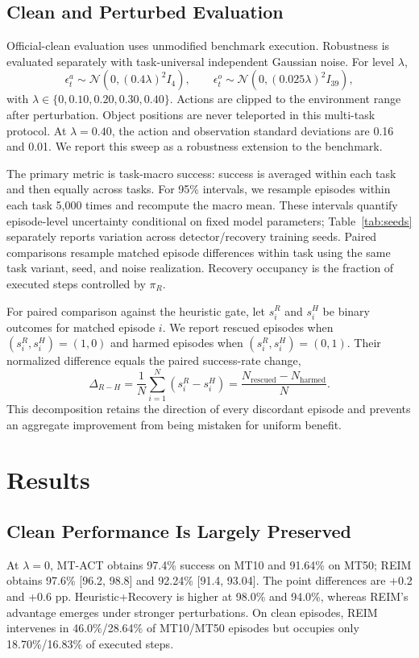 \documentclass[conference]{IEEEtran}
\newcommand{\noise}{\lambda}
\begin{document}
\subsection{Clean and Perturbed Evaluation}
Official-clean evaluation uses unmodified benchmark execution. Robustness is evaluated separately with task-universal independent Gaussian noise. For level $\noise$,
\begin{equation}
 \epsilon^a_t\sim\mathcal{N}(0,(0.4\noise)^2I_4),\qquad
 \epsilon^o_t\sim\mathcal{N}(0,(0.025\noise)^2I_{39}),
\end{equation}
with $\noise\in\{0,0.10,0.20,0.30,0.40\}$. Actions are clipped to the environment range after perturbation. Object positions are never teleported in this multi-task protocol. At $\noise=0.40$, the action and observation standard deviations are 0.16 and 0.01. We report this sweep as a robustness extension to the benchmark.

The primary metric is task-macro success: success is averaged within each task and then equally across tasks. For 95\% intervals, we resample episodes within each task 5,000 times and recompute the macro mean. These intervals quantify episode-level uncertainty conditional on fixed model parameters; Table~\ref{tab:seeds} separately reports variation across detector/recovery training seeds. Paired comparisons resample matched episode differences within task using the same task variant, seed, and noise realization. Recovery occupancy is the fraction of executed steps controlled by $\pi_R$.

For paired comparison against the heuristic gate, let $s_i^R$ and $s_i^H$ be binary outcomes for matched episode $i$. We report rescued episodes when $(s_i^R,s_i^H)=(1,0)$ and harmed episodes when $(s_i^R,s_i^H)=(0,1)$. Their normalized difference equals the paired success-rate change,
\begin{equation}
 \Delta_{R-H}=\frac{1}{N}\sum_{i=1}^{N}(s_i^R-s_i^H)
 =\frac{N_{\mathrm{rescued}}-N_{\mathrm{harmed}}}{N}.
\end{equation}
This decomposition retains the direction of every discordant episode and prevents an aggregate improvement from being mistaken for uniform benefit.

\section{Results}
\label{sec:results}

\subsection{Clean Performance Is Largely Preserved}
At $\noise=0$, MT-ACT obtains 97.4\% success on MT10 and 91.64\% on MT50; REIM obtains 97.6\% [96.2, 98.8] and 92.24\% [91.4, 93.04]. The point differences are +0.2 and +0.6 pp. Heuristic+Recovery is higher at 98.0\% and 94.0\%, whereas REIM's advantage emerges under stronger perturbations. On clean episodes, REIM intervenes in 46.0\%/28.64\% of MT10/MT50 episodes but occupies only 18.70\%/16.83\% of executed steps.
\end{document}
